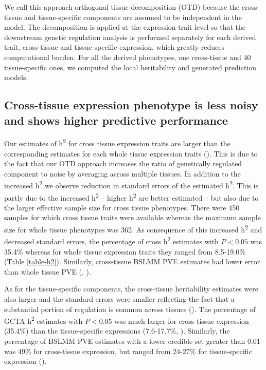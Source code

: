 \documentclass[10pt,letterpaper]{article}
\begin{document}
We call this approach orthogonal tissue decomposition (OTD) because the cross-tissue and tissue-specific components are assumed to be independent in the model. The decomposition is applied at the expression trait level so that the downstream genetic regulation analysis is performed separately for each derived trait, cross-tissue and tissue-specific expression, which greatly reduces computational burden. For all the derived phenotypes, one cross-tissue and 40 tissue-specific ones, we computed the local heritability and generated prediction models.

\subsection*{Cross-tissue expression phenotype is less noisy and shows higher predictive performance}%

Our estimates of h\textsuperscript{2} for cross tissue expression traits are larger than the corresponding estimates for each whole tissue expression traits ().
This is due to the fact that our OTD approach increases the ratio of genetically regulated component to noise by averaging across multiple tissues. In addition to the increased h\textsuperscript{2} we observe reduction in standard errors of the estimated h\textsuperscript{2}. This is partly due to the increased h\textsuperscript{2} -- higher h\textsuperscript{2} are better estimated -- but also due to the larger effective sample size for cross tissue phenotypes. There were 450 samples for which cross tissue traits were available whereas the maximum sample size for whole tissue phenotypes was 362. As consequence of this increased h\textsuperscript{2} and decreased standard errors, the percentage of cross h\textsuperscript{2} estimates with $P < 0.05$ was 35.4\% whereas for whole tissue expression traits they ranged from 8.5-19.0\% (Table \ref{table-h2}). Similarly, cross-tissue BSLMM PVE estimates had lower error than whole tissue PVE (, ). 

As for the tissue-specific components, 
the cross-tissue heritability estimates were also larger and the standard errors were smaller reflecting the fact that a substantial portion of regulation is common across tissues (). The percentage of GCTA h\textsuperscript{2} estimates with $P < 0.05$ was much larger for cross-tissue expression (35.4\%) than the tissue-specific expressions (7.6-17.7\%, ). Similarly, the percentage of BSLMM PVE estimates with a lower credible set greater than 0.01 was 49\% for cross-tissue expression, but ranged from 24-27\% for tissue-specific expression ().
\end{document}
